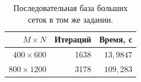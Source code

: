 \begin{table}[H]
\centering\small
\caption{Последовательная база больших сеток в том же задании.}
\begin{tabular}{rrr}
\toprule
$M\times N$ & Итераций & Время, с \\
\midrule
$400\times600$ & 1638 & $13{,}9847$ \\
$800\times1200$ & 3178 & $109{,}283$ \\
\bottomrule
\end{tabular}
\end{table}
